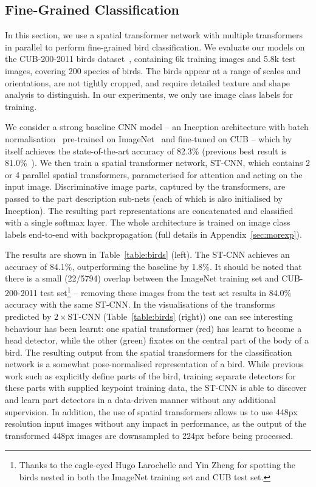 \documentclass{article} %
\newcommand{\tblref}[1]{Table~\ref{#1}}
\begin{document}
\subsection{Fine-Grained Classification}\label{sec:fgc}

In this section, we use a spatial transformer network with multiple transformers in parallel to perform fine-grained bird classification. 
We evaluate our models on the CUB-200-2011 birds dataset~\cite{Wah11}, containing 6k training images and 5.8k test images, covering 200 species of birds. 
The birds appear at a range of scales and orientations, are not tightly cropped, and require detailed texture and shape analysis to distinguish.
In our experiments, we only use image class labels for training.

We consider a strong baseline CNN model -- an Inception architecture with batch normalisation~\cite{Ioffe15} pre-trained on ImageNet~\cite{Russakovsky14}
and fine-tuned on CUB -- which by itself achieves the state-of-the-art accuracy of 82.3\% (previous best result is 81.0\%~\cite{Simon15}). 
We then train a spatial transformer network, ST-CNN, which contains 2 or 4 parallel spatial transformers, parameterised for attention
and acting on the input image. Discriminative image parts, captured by the transformers, are passed to the part description sub-nets (each of which is
also initialised by Inception). The resulting part representations are concatenated and classified with a single softmax layer.
The whole architecture is trained on image class labels end-to-end with backpropagation (full details in Appendix~\ref{sec:morexp}).

The results are shown in \tblref{table:birds} (left).
The ST-CNN achieves an accuracy of 84.1\%, outperforming the baseline by 1.8\%. It should be noted that there is a small (22/5794) overlap between the ImageNet training set and CUB-200-2011 test set\footnote{Thanks to the eagle-eyed Hugo Larochelle and Yin Zheng  for spotting the birds nested in both the ImageNet training set and CUB test set.} -- removing these images from the test set results in 84.0\% accuracy with the same ST-CNN.
In the visualisations of the transforms predicted by {$2\times$ST-CNN} (\tblref{table:birds} (right)) one can see interesting behaviour has been learnt: 
one spatial transformer (red) has learnt to become a head detector, while the other (green) fixates on the central part of the body of a bird. 
The resulting output from the spatial transformers for the classification network is a somewhat pose-normalised representation of a bird. 
While previous work such as \cite{Branson14} explicitly define parts of the bird, training separate detectors for these parts with supplied 
keypoint training data, the ST-CNN is able to discover and learn part detectors in a data-driven manner without any additional supervision. In addition, the use of spatial transformers allows us to use 448px resolution input images without any impact in performance, as the output of the transformed 448px images are downsampled to 224px before being processed.
\end{document}
